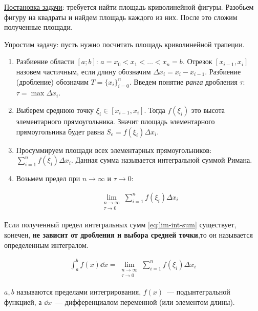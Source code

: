 
\underline{Постановка задачи}: требуется найти площадь криволинейной фигуры.
Разобьем фигуру на квадраты и найдем площадь каждого из них. После это сложим
полученные площади.



Упростим задачу: пусть нужно посчитать площадь криволинейной трапеции.

\begin{minipage}{\linewidth}
  \begin{multicols*}{2}
    
    \columnbreak

    \begin{enumerate}
      \item Разбиение области \([a;b]\):
      \(a = x_{0} < x_{1} < \dotsc < x_{n} = b\).
      Отрезок \([x_{i - 1}, x_{i}]\) назовем частичным, если длину обозначим 
      \(\Delta x_{i} = x_{i} - x_{i - 1}\).
      Разбиение (дробление) обозначим \(T = \{ x_{i} \}_{i = 0}^{n}\). Введем
      понятие \textit{ранга} дробления \(\tau\): \(\tau = \max \Delta x_{i}\).

      \item Выберем среднюю точку \(\xi_{i} \in [x_{i - 1}, x_{i}]\). Тогда
      \(f(\xi_{i})\) это высота элементарного прямоугольника. Значит площадь
      элементарного прямоугольника будет равна
      \(S_{e} = f(\xi_{i}) \Delta x_{i}\).

      \item Просуммируем площади всех элементарных прямоугольников:
      \(\sum_{i = 1}^{n} f(\xi_{i}) \Delta x_{i}\). Данная сумма называется
      интегральной суммой Римана.

      \item Возьмем предел при \(n \to \infty\) и \(\tau \to 0\):
      
      \begin{align*}\label{eq:lim-int-sum}\tag{1}
        \lim_{\substack{n \to \infty \\ \tau \to 0}}
          \sum_{i = 1}^{n} f(\xi_{i}) \Delta x_{i}
      \end{align*}
    \end{enumerate}
  \end{multicols*}
\end{minipage}

\begin{definition}
  Если полученный предел интегральных сумм \eqref{eq:lim-int-sum} существует,
  конечен, \textbf{не зависит от дробления и выбора средней точки},то он
  называется определенным интегралом.

  \begin{align*}
    \int_{a}^{b} f(x) \dd x = \lim_{\substack{n \to \infty \\ \tau \to 0}}
      \sum_{i = 1}^{n} f(\xi_{i}) \Delta x_{i}
  \end{align*}

  \(a, b\) называются пределами интегрирования, \(f(x)\)~--- подынтегральной
  функцией, а \(\dd x\)~--- дифференциалом переменной (или элементом длины).
\end{definition}


